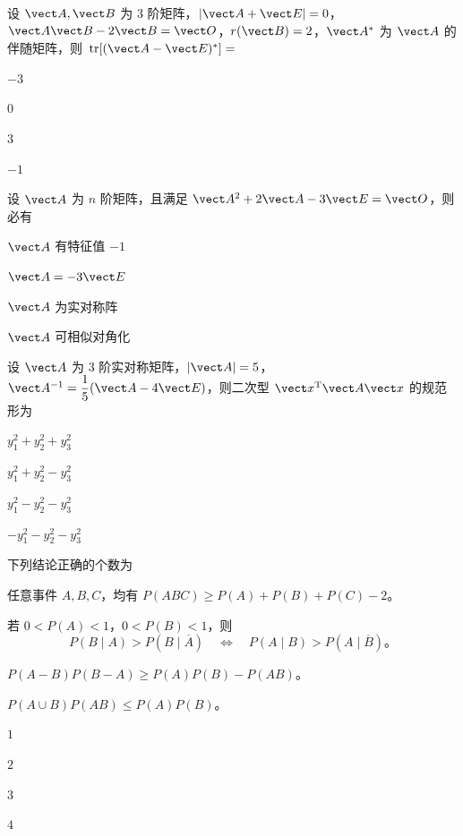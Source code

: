\begin{question}[index=5]
设 $\vect A,\vect B$ 为 $3$ 阶矩阵，$|\vect A+\vect E|=0$，$\vect A\vect B-2\vect B=\vect O$，$r(\vect B)=2$，$\vect A^*$ 为 $\vect A$ 的伴随矩阵，\allowbreak\mbox{则 $\operatorname{tr}[(\vect A-\vect E)^*]=$}
\begin{choices}[columns=4]
\item $-3$
\item $0$
\item $3$
\item $-1$
\end{choices}
\end{question}
\QuestionBreak

\begin{question}[index=6]
设 $\vect A$ 为 $n$ 阶矩阵，且满足 $\vect A^2+2\vect A-3\vect E=\vect O$，则必有
\begin{choices}[columns=2]
\item $\vect A$ 有特征值 $-1$
\item $\vect A=-3\vect E$
\item $\vect A$ 为实对称阵
\item $\vect A$ 可相似对角化
\end{choices}
\end{question}
\QuestionBreak

\begin{question}[index=7]
设 $\vect A$ 为 $3$ 阶实对称矩阵，$|\vect A|=5$，$\vect A^{-1}=\dfrac15(\vect A-4\vect E)$，则二次型 $\vect x^{\mathrm T}\vect A\vect x$ 的规范形为
\begin{choices}[columns=4]
\item $y_1^2+y_2^2+y_3^2$
\item $y_1^2+y_2^2-y_3^2$
\item $y_1^2-y_2^2-y_3^2$
\item $-y_1^2-y_2^2-y_3^2$
\end{choices}
\end{question}
\QuestionBreak

\begin{question}[index=8]
下列结论正确的个数为
\par{} 任意事件 $A,B,C$，均有 $P(ABC)\ge P(A)+P(B)+P(C)-2$。
\par{} 若 $0<P(A)<1$，$0<P(B)<1$，则
\[
P(B\mid A)>P(B\mid\overline A)
\quad\Longleftrightarrow\quad
P(A\mid B)>P(A\mid\overline B)\text{。}
\]
\par{} $P(A-B)P(B-A)\ge P(A)P(B)-P(AB)$。
\par{} $P(A\cup B)P(AB)\le P(A)P(B)$。
\begin{choices}[columns=4]
\item $1$
\item $2$
\item $3$
\item $4$
\end{choices}
\end{question}
\QuestionBreak

